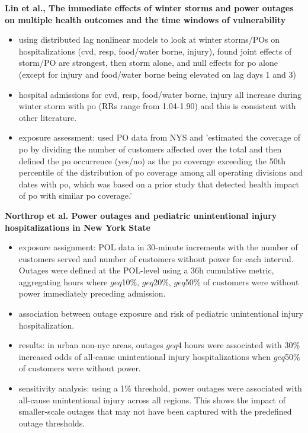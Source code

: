 \textbf{Lin et al., The immediate effects of winter storms and power outages on multiple health outcomes and the time windows of vulnerability}
\begin{itemize}
    \item using distributed lag nonlinear models to look at winter storms/POs on hospitalizations (cvd, resp, food/water borne, injury), found joint effects of storm/PO are strongest, then storm alone, and null effects for po alone (except for injury and food/water borne being elevated on lag days 1 and 3)
    \item hospital admissions for cvd, resp, food/water borne, injury all increase during winter storm with po (RRs range from 1.04-1.90) and this is consistent with other literature. 
    \item exposure assessment: used PO data from NYS and 'estimated the coverage of po by dividing the number of customers affected over the total and then defined the po occurrence (yes/no) as the po coverage exceeding the 50th percentile of the distribution of po coverage among all operating divisions and dates with po, which was based on a prior study that detected health impact of po with similar po coverage.'
\end{itemize}

\textbf{Northrop et al. Power outages and pediatric unintentional injury hospitalizations in New York State}
\begin{itemize}
    \item exposure assignment: POL data in 30-minute increments with the number of customers served and number of customers without power for each interval. Outages were defined at the POL-level using a 36h cumulative metric, aggregating hours where $geq$10\%, $geq$20\%, $geq$50\% of customers were without power immediately preceding admission. 
    \item association between outage exposure and risk of pediatric unintentional injury hospitalization. 
    \item results: in urban non-nyc areas, outages $geq$4 hours were associated with 30\% increased odds of all-cause unintentional injury hospitalizations when $geq$50\% of customers were without power. 
    \item sensitivity analysis: using a 1\% threshold, power outages were associated with all-cause unintentional injury across all regions. This shows the impact of smaller-scale outages that may not have been captured with the predefined outage thresholds. 
\end{itemize}

